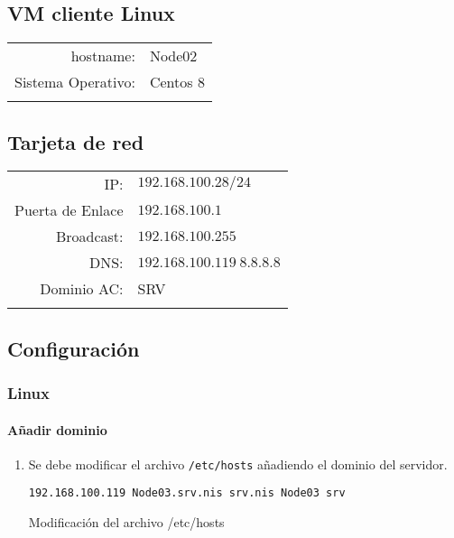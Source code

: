 \documentclass[../main.tex]{subfiles}
\begin{document}
\subsection{VM cliente Linux}\label{sec:cliente_vmlinux}
\begin{table}[htbp]
  \centering
  \begin{tabular}{rl}
    \hline{}
    hostname:&Node02\\
    Sistema Operativo:&Centos 8\\
    \hline{}
  \end{tabular}
\end{table}

\subsection{Tarjeta de red}\label{sec:ctr}
\begin{table}[htbp]
  \centering
  \begin{tabular}{rl}
    \hline{}
    IP:&$192.168.100.28/24$\\
    Puerta de Enlace&$192.168.100.1$\\
    Broadcast:&$192.168.100.255$\\
    DNS:&$192.168.100.119\ 8.8.8.8$\\
    Dominio AC:&SRV\\
    \hline{}
  \end{tabular}
\end{table}


\subsection{Configuración}\label{sec:cliente_conf}

\subsubsection{Linux}\label{sec:cliente_linux}

\paragraph{Añadir dominio}
\begin{enumerate}
  \item Se debe modificar el archivo \texttt{/etc/hosts} añadiendo
        el dominio del servidor.
        \begin{listing}[H]
\begin{verbatim}
192.168.100.119 Node03.srv.nis srv.nis Node03 srv
\end{verbatim}
          \label{list:hosts}
          \caption{Modificación del archivo /etc/hosts}
        \end{listing}
\end{enumerate}
\end{document}

